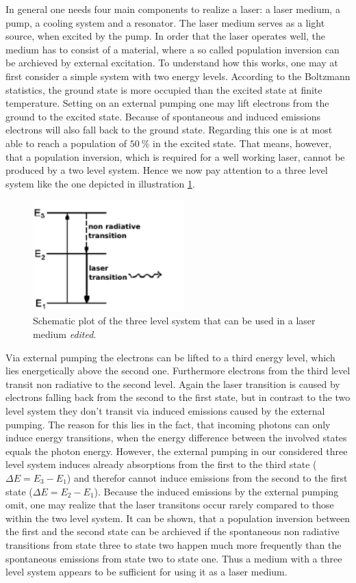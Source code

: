 In general one needs four main components to realize a laser: a laser medium, a pump, a cooling system and a resonator.
The laser medium serves as a light source, when excited by the pump.
In order that the laser operates well, the medium has to consist of a material, where a so called population
inversion can be archieved by external excitation. To understand how this works, one may at first consider a
simple system with two energy levels. According to the Boltzmann statistics, the ground state is more occupied
than the excited state at finite temperature. Setting on an external pumping one may lift electrons from the
ground to the excited state. Because of spontaneous and induced emissions electrons will also fall back
to the ground state. Regarding this one is at most able to reach a population of $\SI{50}{\percent}$ in the excited
state. That means, however, that a population inversion, which is required for a well working laser, cannot be
produced by a two level system. Hence we now pay attention to a three level system like the one depicted in
illustration \ref{fig:threelevelsystem}.
\begin{figure}
  \centering
  \includegraphics[height = 4.3cm]{Ordnername/threelevel_edit.pdf}
  \caption{Schematic plot of the three level system that can be used in a laser medium \cite{threelevel} \textit{edited}.}
  \label{fig:threelevelsystem}
\end{figure}
Via external pumping the electrons can be lifted to a third energy level, which lies energetically above the second one.
Furthermore electrons from the third level transit non radiative to the second level. Again the laser transition is
caused by electrons falling back from the second to the first state, but in contrast to the two level system they
don't transit via induced emissions caused by the external pumping. The reason for this lies in the fact,
that incoming photons can only induce energy transitions,
when the energy difference between the involved states equals the photon energy. However, the external pumping
in our considered three level system induces already absorptions from the first to the third state
($\Delta E = E_3 - E_1$) and therefor cannot induce emissions from the second to the first
state ($\Delta E = E_2 - E_1$). Because the induced emissions by the external pumping omit, one may realize
that the laser transitons occur rarely compared to those within the two level system. It can be shown,
that a population inversion between the first and the second state can be archieved if the
spontaneous non radiative transitions from state three to state two happen much more frequently than the
spontaneous emissions from state two to state one. Thus a medium with a three level system
appears to be sufficient for using it as a laser medium.

